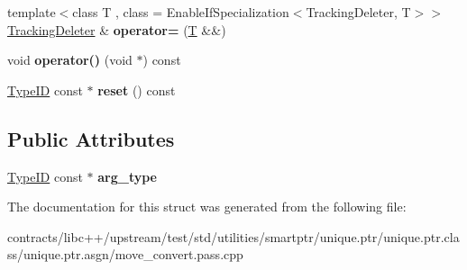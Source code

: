 \begin{DoxyCompactItemize}
{\footnotesize template$<$class T , class  = Enable\+If\+Specialization$<$\+Tracking\+Deleter, T$>$$>$ }\\\mbox{\hyperlink{struct_tracking_deleter}{Tracking\+Deleter}} \& {\bfseries operator=} (\mbox{\hyperlink{struct_t}{T}} \&\&)
\item 
\mbox{\label{struct_tracking_deleter_ae07ab19cc0c8effadff7e39004ac2d73}} 
void {\bfseries operator()} (void $\ast$) const
\item 
\mbox{\label{struct_tracking_deleter_ad712e8bf1d8a1d2fef392116e4786a18}} 
\mbox{\hyperlink{struct_type_i_d}{Type\+ID}} const  $\ast$ {\bfseries reset} () const
\end{DoxyCompactItemize}
\subsection*{Public Attributes}
\begin{DoxyCompactItemize}
\item 
\mbox{\label{struct_tracking_deleter_aa18bcd3ce7614e0105cc9d742754ba75}} 
\mbox{\hyperlink{struct_type_i_d}{Type\+ID}} const  $\ast$ {\bfseries arg\+\_\+type}
\end{DoxyCompactItemize}


The documentation for this struct was generated from the following file\+:\begin{DoxyCompactItemize}
\item 
contracts/libc++/upstream/test/std/utilities/smartptr/unique.\+ptr/unique.\+ptr.\+class/unique.\+ptr.\+asgn/move\+\_\+convert.\+pass.\+cpp\end{DoxyCompactItemize}
